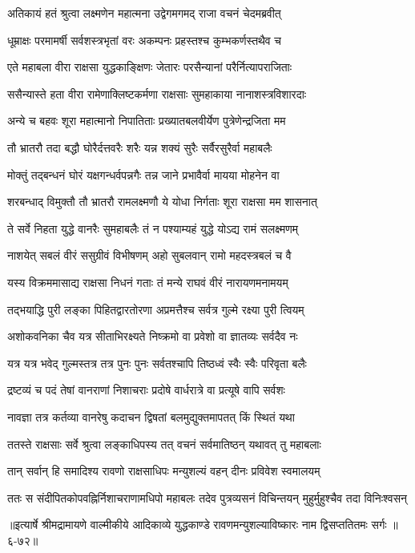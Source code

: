 
\twolineshloka
{अतिकायं हतं श्रुत्वा लक्ष्मणेन महात्मना}
{उद्वेगमगमद् राजा वचनं चेदमब्रवीत्} %

\twolineshloka
{धूम्राक्षः परमामर्षी सर्वशस्त्रभृतां वरः}
{अकम्पनः प्रहस्तश्च कुम्भकर्णस्तथैव च} %

\twolineshloka
{एते महाबला वीरा राक्षसा युद्धकाङ्क्षिणः}
{जेतारः परसैन्यानां परैर्नित्यापराजिताः} %

\twolineshloka
{ससैन्यास्ते हता वीरा रामेणाक्लिष्टकर्मणा}
{राक्षसाः सुमहाकाया नानाशस्त्रविशारदाः} %

\twolineshloka
{अन्ये च बहवः शूरा महात्मानो निपातिताः}
{प्रख्यातबलवीर्येण पुत्रेणेन्द्रजिता मम} %

\twolineshloka
{तौ भ्रातरौ तदा बद्धौ घोरैर्दत्तवरैः शरैः}
{यन्न शक्यं सुरैः सर्वैरसुरैर्वा महाबलैः} %

\twolineshloka
{मोक्तुं तद्बन्धनं घोरं यक्षगन्धर्वपन्नगैः}
{तन्न जाने प्रभावैर्वा मायया मोहनेन वा} %

\twolineshloka
{शरबन्धाद् विमुक्तौ तौ भ्रातरौ रामलक्ष्मणौ}
{ये योधा निर्गताः शूरा राक्षसा मम शासनात्} %

\twolineshloka
{ते सर्वे निहता युद्धे वानरैः सुमहाबलैः}
{तं न पश्याम्यहं युद्धे योऽद्य रामं सलक्ष्मणम्} %

\twolineshloka
{नाशयेत् सबलं वीरं ससुग्रीवं विभीषणम्}
{अहो सुबलवान् रामो महदस्त्रबलं च वै} %

\twolineshloka
{यस्य विक्रममासाद्य राक्षसा निधनं गताः}
{तं मन्ये राघवं वीरं नारायणमनामयम्} %

\twolineshloka
{तद्भयाद्धि पुरी लङ्का पिहितद्वारतोरणा}
{अप्रमत्तैश्च सर्वत्र गुल्मे रक्ष्या पुरी त्वियम्} %

\twolineshloka
{अशोकवनिका चैव यत्र सीताभिरक्ष्यते}
{निष्क्रमो वा प्रवेशो वा ज्ञातव्यः सर्वदैव नः} %

\twolineshloka
{यत्र यत्र भवेद् गुल्मस्तत्र तत्र पुनः पुनः}
{सर्वतश्चापि तिष्ठध्वं स्वैः स्वैः परिवृता बलैः} %

\twolineshloka
{द्रष्टव्यं च पदं तेषां वानराणां निशाचराः}
{प्रदोषे वार्धरात्रे वा प्रत्यूषे वापि सर्वशः} %

\twolineshloka
{नावज्ञा तत्र कर्तव्या वानरेषु कदाचन}
{द्विषतां बलमुद्युक्तमापतत् किं स्थितं यथा} %

\twolineshloka
{ततस्ते राक्षसाः सर्वे श्रुत्वा लङ्काधिपस्य तत्}
{वचनं सर्वमातिष्ठन् यथावत् तु महाबलाः} %

\twolineshloka
{तान् सर्वान् हि समादिश्य रावणो राक्षसाधिपः}
{मन्युशल्यं वहन् दीनः प्रविवेश स्वमालयम्} %

\twolineshloka
{ततः स संदीपितकोपवह्निर्निशाचराणामधिपो महाबलः}
{तदेव पुत्रव्यसनं विचिन्तयन् मुहुर्मुहुश्चैव तदा विनिःश्वसन्} %


॥इत्यार्षे श्रीमद्रामायणे वाल्मीकीये आदिकाव्ये युद्धकाण्डे रावणमन्युशल्याविष्कारः नाम द्विसप्ततितमः सर्गः ॥६-७२॥
